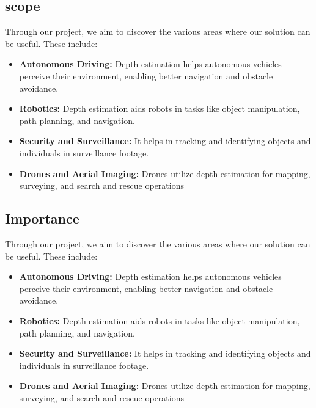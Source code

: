\documentclass[12pt,a4paper]{report}
\begin{document}
\subsection*{ scope}
Through our project, we aim to discover the various areas where our solution can be useful. These include:
\begin{itemize}
    \item \textbf{Autonomous Driving:} Depth estimation helps autonomous vehicles perceive their environment, enabling better navigation and obstacle avoidance.
      
    \item \textbf{Robotics:} Depth estimation aids robots in tasks like object manipulation, path planning, and navigation.
       
    \item \textbf{Security and Surveillance:} It helps in tracking and identifying objects and individuals in surveillance footage.
    
    \item \textbf{Drones and Aerial Imaging:}  Drones utilize depth estimation for mapping, surveying, and search and rescue operations
\end{itemize}
\subsection*{ Importance}
Through our project, we aim to discover the various areas where our solution can be useful. These include:
\begin{itemize}
    \item \textbf{Autonomous Driving:} Depth estimation helps autonomous vehicles perceive their environment, enabling better navigation and obstacle avoidance.
      
    \item \textbf{Robotics:} Depth estimation aids robots in tasks like object manipulation, path planning, and navigation.
       
    \item \textbf{Security and Surveillance:} It helps in tracking and identifying objects and individuals in surveillance footage.
    
    \item \textbf{Drones and Aerial Imaging:}  Drones utilize depth estimation for mapping, surveying, and search and rescue operations
\end{itemize}
\end{document}
